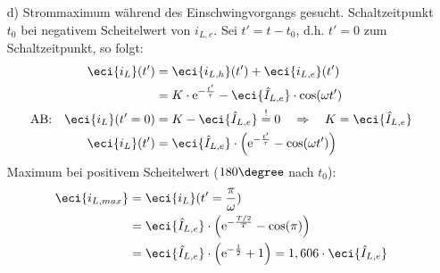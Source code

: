 {\begin{enumerate}
    D.h. für verschwindenden flüchtigen Zustand (kein Einschwingvorgang) folgt:
    \begin{align*}
        &\text{AB:}&\eci{i_L}(t_0) = \eci{i_{L,e}}(t_0) &= \eci{\hat{I}_{L,e}} \cdot \sin(\omega t_0 + \varphi) \overset{!}= 0 &
            &\Rightarrow \eci{i_L}(t')=\eci{i_{L,e}}(t') \Leftrightarrow \eci{i_{L,f}}(t')=0\\
        &&\Leftrightarrow \omega t_0 + \varphi &\overset{!}{=} 0 + n\cdot \pi &
            &\text{mit} \quad n \in \mathbb{N} \\
        &&t_{min} &= \frac{n\cdot \pi - \varphi}{\omega} &
            &\text{entspricht Nulldurchgängen von $\eci{i_{L,e}}$}\\
        \end{align*}
        Und für maximalen flüchtigen Zustand (Schaltzeitpunkt $90\degree$ versetzt) folgt:
        \begin{align*}
        &&t_{max} &= \frac{n\cdot \pi - \varphi}{\omega} + \frac{T}{4} &
            &\text{entspricht Extremstellen von $\eci{i_{L,e}}$}
    \end{align*}
    \item[d)] Strommaximum während des Einschwingvorgangs gesucht. 
    Schaltzeitpunkt $t_0$ bei negativem Scheitelwert von $i_{L,e}$. 
    Sei $t' = t - t_0$, d.h. $t'=0$ zum Schaltzeitpunkt, so folgt:
    \begin{align*}
        \eci{i_L}(t') &= \eci{i_{L,h}}(t') + \eci{i_{L,e}}(t') \\
        &= K \cdot \mathrm{e}^{-\frac{t'}{\tau}} - \eci{\hat{I}_{L,e}} \cdot \cos(\omega t')\\
        \text{AB:}\quad \eci{i_L}(t'=0) &= K - \eci{\hat{I}_{L,e}}  \overset{!}{=}0 \quad \Rightarrow \quad K = \eci{\hat{I}_{L,e}}\\
        \eci{i_L}(t') &= \eci{\hat{I}_{L,e}} \cdot \left( \mathrm{e}^{-\frac{t'}{\tau}} - \cos(\omega t') \right) \\
        \end{align*}
        Maximum bei positivem Scheitelwert ($180\degree$ nach $t_0$):
        \begin{align*}
        \eci{i_{L,max}} &= \eci{i_L}(t' = \frac{\pi}{\omega}) \\
        &= \eci{\hat{I}_{L,e}} \cdot \left( \mathrm{e}^{-\frac{T/2}{T}} - \cos(\pi) \right) \\
        &= \eci{\hat{I}_{L,e}} \cdot \left( \mathrm{e}^{-\frac{1}{2}} + 1\right) = 1,606 \cdot \eci{\hat{I}_{L,e}}
    \end{align*}
    \end{enumerate}
}
